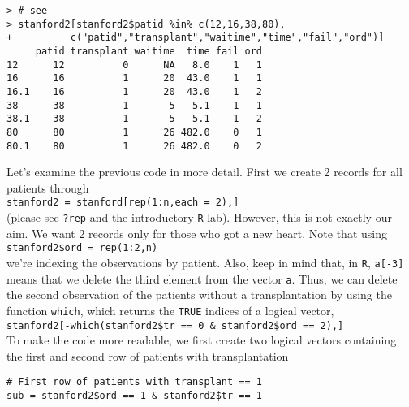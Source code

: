 \begin{enumerate}[(a)]
\begin{enumerate}[(i)]
\begin{spacing}{1.2}
\begin{footnotesize}
\begin{verbatim}
> # see
> stanford2[stanford2$patid %in% c(12,16,38,80),
+          c("patid","transplant","waitime","time","fail","ord")]
     patid transplant waitime  time fail ord
12      12          0      NA   8.0    1   1
16      16          1      20  43.0    1   1
16.1    16          1      20  43.0    1   2
38      38          1       5   5.1    1   1
38.1    38          1       5   5.1    1   2
80      80          1      26 482.0    0   1
80.1    80          1      26 482.0    0   2
\end{verbatim}
\end{footnotesize}
\end{spacing}
Let's examine the previous code in more detail. First we create 2 records for all patients through \\[0.3\baselineskip]
\verb|stanford2 = stanford[rep(1:n,each = 2),]| \\[0.3\baselineskip]
(please see \verb|?rep| and the introductory \verb|R| lab). However, this is not exactly our aim. We want 2 records only for those who got a new heart. Note that using\\[0.3\baselineskip]
 \verb|stanford2$ord = rep(1:2,n)| \\[0.3\baselineskip]
 we're indexing the observations by patient. Also, keep in mind that, in \verb|R|, \verb|a[-3]| means that we delete the third element from the vector \verb|a|. Thus, we can delete the second observation of the patients without a transplantation by using the function \verb|which|, which returns the \verb|TRUE| indices of a logical vector,\\[0.3\baselineskip]
\verb|stanford2[-which(stanford2$tr == 0 & stanford2$ord == 2),]|
\\[0.3\baselineskip]  
To make the code more readable, we first create two logical vectors containing the first and second row of patients with transplantation
\begin{spacing}{1.2}
\begin{footnotesize}
\begin{verbatim}
# First row of patients with transplant == 1
sub = stanford2$ord == 1 & stanford2$tr == 1


\end{verbatim}
\end{footnotesize}
\end{spacing}
\end{enumerate}
\end{enumerate}
